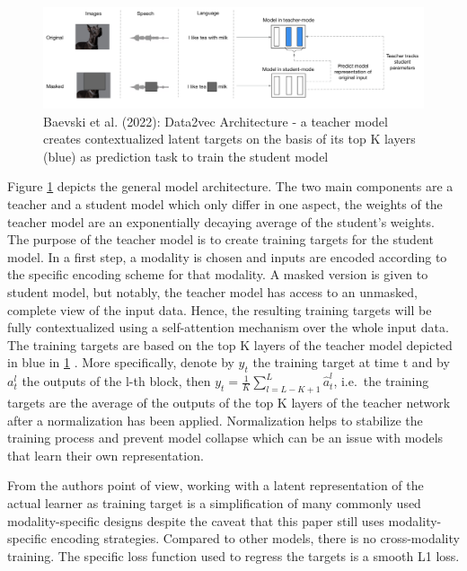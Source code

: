 \documentclass[
]{krantz}
\begin{document}
\begin{figure}

{\centering \includegraphics[width=1\linewidth]{figures/05-chapter2/datavecoverview} 

}

\caption{Baevski et al. (2022): Data2vec Architecture - a teacher model creates contextualized latent targets on the basis of its top K layers (blue) as prediction task to train the student model}\label{fig:data2vecoverview}
\end{figure}

Figure \ref{fig:data2vecoverview} depicts the general model architecture. The two main components are a teacher and a student model which only differ in one aspect, the weights of the teacher model are an exponentially decaying average of the student's weights. The purpose of the teacher model is to create training targets for the student model.
In a first step, a modality is chosen and inputs are encoded according to the specific encoding scheme for that modality. A masked version is given to student model, but notably, the teacher model has access to an unmasked, complete view of the input data. Hence, the resulting training targets will be fully contextualized using a self-attention mechanism over the whole input data. The training targets are based on the top K layers of the teacher model depicted in blue in \ref{fig:data2vecoverview} . More specifically, denote by \(y_t\) the training target at time t and by \(a_t^l\) the outputs of the l-th block, then \(y_t = \frac{1}{K}\sum_{l=L-K+1}^{L} \hat{a}_t^l\), i.e.~the training targets are the average of the outputs of the top K layers of the teacher network after a normalization has been applied. Normalization helps to stabilize the training process and prevent model collapse which can be an issue with models that learn their own representation.

From the authors point of view, working with a latent representation of the actual learner as training target is a simplification of many commonly used modality-specific designs despite the caveat that this paper still uses modality-specific encoding strategies. Compared to other models, there is no cross-modality training. The specific loss function used to regress the targets is a smooth L1 loss.
\end{document}
